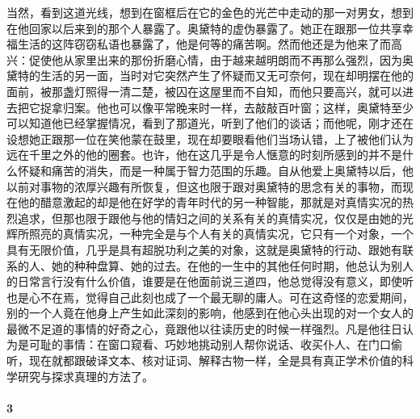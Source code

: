 \par 当然，看到这道光线，想到在窗框后在它的金色的光芒中走动的那一对男女，想到在他回家以后来到的那个人暴露了。奥黛特的虚伪暴露了。她正在跟那一位共享幸福生活的这阵窃窃私语也暴露了，他是何等的痛苦啊。然而他还是为他来了而高兴：促使他从家里出来的那份折磨心情，由于越来越明朗而不再那么强烈，因为奥黛特的生活的另一面，当时对它突然产生了怀疑而又无可奈何，现在却明摆在他的面前，被那盏灯照得一清二楚，被囚在这屋里而不自知，而他只要高兴，就可以进去把它捉拿归案。他也可以像平常晚来时一样，去敲敲百叶窗；这样，奥黛特至少可以知道他已经掌握情况，看到了那道光，听到了他们的谈话；而他呢，刚才还在设想她正跟那一位在笑他蒙在鼓里，现在却要眼看他们当场认错，上了被他们认为远在千里之外的他的圈套。也许，他在这几乎是令人惬意的时刻所感到的并不是什么怀疑和痛苦的消失，而是一种属于智力范围的乐趣。自从他爱上奥黛特以后，他以前对事物的浓厚兴趣有所恢复，但这也限于跟对奥黛特的思念有关的事物，而现在他的醋意激起的却是他在好学的青年时代的另一种智能，那就是对真情实况的热烈追求，但那也限于跟他与他的情妇之间的关系有关的真情实况，仅仅是由她的光辉所照亮的真情实况，一种完全是与个人有关的真情实况，它只有一个对象，一个具有无限价值，几乎是具有超脱功利之美的对象，这就是奥黛特的行动、跟她有联系的人、她的种种盘算、她的过去。在他的一生中的其他任何时期，他总认为别人的日常言行没有什么价值，谁要是在他面前说三道四，他总觉得没有意义，即使听也是心不在焉，觉得自己此刻也成了一个最无聊的庸人。可在这奇怪的恋爱期间，别的一个人竟在他身上产生如此深刻的影响，他感到在他心头出现的对一个女人的最微不足道的事情的好奇之心，竟跟他以往读历史的时候一样强烈。凡是他往日认为是可耻的事情：在窗口窥看、巧妙地挑动别人帮你说话、收买仆人、在门口偷听，现在就都跟破译文本、核对证词、解释古物一样，全是具有真正学术价值的科学研究与探求真理的方法了。




\paragraph*{3}

